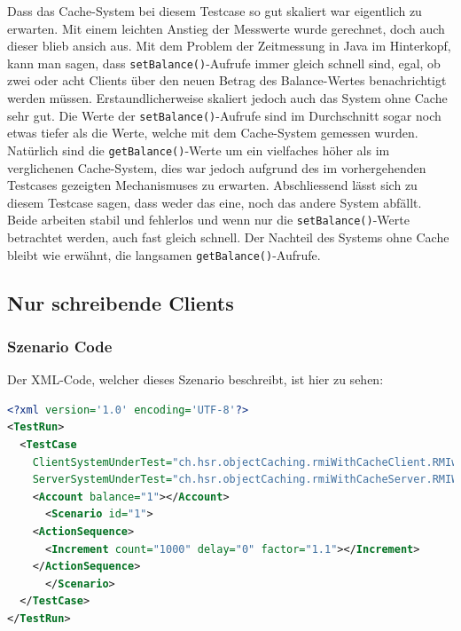 Dass das Cache-System bei diesem Testcase so gut ska\-liert war eigentlich zu erwarten. Mit einem leichten An\-s\-tieg der Mess\-werte wurde gerechnet, doch auch dieser blieb ansich aus. Mit dem Pro\-blem der Zeit\-messung in Java im Hinter\-kopf, kann man sagen, dass \texttt{setBalance()}-Aufrufe immer gleich schnell sind, egal, ob zwei oder acht Clients über den neuen Betrag des Balance-Wertes benachrichtigt werden müssen.\newline
Erstaundlicherweise skaliert jedoch auch das System ohne Cache sehr gut. Die Werte der \texttt{setBalance()}-Aufrufe sind im Durch\-schnitt sogar noch etwas tiefer als die Werte, welche mit dem Cache-System gemessen wurden. Natürlich sind die \texttt{getBalance()}-Werte um ein vielfaches höher als im verglichenen Cache-System, dies war jedoch aufgrund des im vorhergehenden Testcases gezeigten Mechanismuses zu erwarten.\newline
Abschliessend lässt sich zu diesem Testcase sagen, dass weder das eine, noch das andere System abfällt. Beide arbeiten stabil und fehlerlos und wenn nur die \texttt{setBalance()}-Werte betrachtet werden, auch fast gleich schnell. Der Nachteil des Systems ohne Cache bleibt wie erwähnt, die langsamen \texttt{getBalance()}-Aufrufe.

\subsection{Nur schreibende Clients}
\subsubsection{Szenario Code}
Der XML-Code, welcher dieses Szenario beschreibt, ist hier zu sehen:
\begin{lstlisting}[language=XML, breaklines=true]
<?xml version='1.0' encoding='UTF-8'?>
<TestRun>
  <TestCase
    ClientSystemUnderTest="ch.hsr.objectCaching.rmiWithCacheClient.RMIwithCacheClientSystem"
    ServerSystemUnderTest="ch.hsr.objectCaching.rmiWithCacheServer.RMIWithCacheServerSystem">
    <Account balance="1"></Account>
      <Scenario id="1">
	<ActionSequence>
	  <Increment count="1000" delay="0" factor="1.1"></Increment>
	</ActionSequence>
      </Scenario>
  </TestCase>
</TestRun>
\end{lstlisting}
